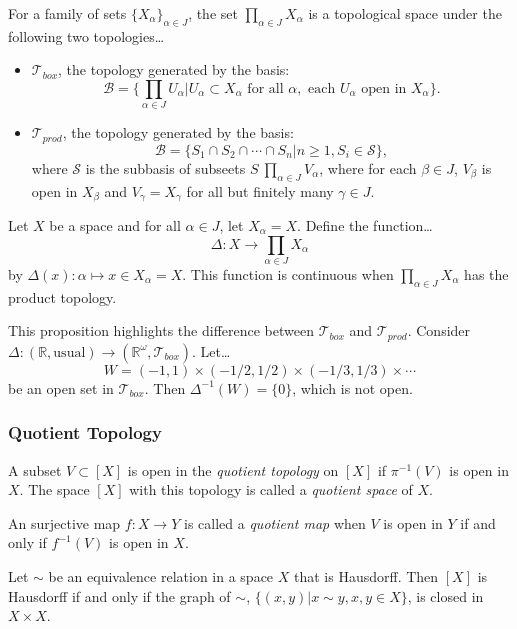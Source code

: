 \label{infiniteproducttopology}
For a family of sets $\{X_{\alpha}\}_{\alpha \in J}$, the set $\prod_{\alpha \in J} X_{\alpha}$ is a topological space under the following two topologies\dots
\begin{itemize}
  \item $\mathcal{T}_{box}$, the topology generated by the basis:
  $$\mathcal{B} = \{ \prod_{\alpha \in J} U_{\alpha} | U_{\alpha} \subset X_{\alpha} \textrm{ for all } \alpha, \textrm{ each } U_{\alpha} \textrm{ open in } X_{\alpha} \}.$$
  \item $\mathcal{T}_{prod}$, the topology generated by the basis:
  $$\mathcal{B} = \{ S_1 \cap S_2 \cap \cdots \cap S_n | n \geq 1, S_i \in \mathcal{S}\},$$
  where $\mathcal{S}$ is the subbasis of subseets $S \ \prod_{\alpha \in J} V_{\alpha}$, where for each $\beta \in J$, $V_{\beta}$ is open in $X_{\beta}$ and $V_{\gamma} = X_{\gamma}$
  for all but finitely many $\gamma \in J$.
\end{itemize}

\begin{proposition}
Let $X$ be a space and for all $\alpha \in J$, let $X_{\alpha} = X$. Define the function\dots
$$\Delta : X \rightarrow \prod_{\alpha \in J} X_{\alpha}$$
by $\Delta(x) : \alpha \mapsto x \in X_{\alpha} = X$. This function is continuous when $\prod_{\alpha \in J} X_{\alpha}$ has the product topology.
\end{proposition}

\noindent This proposition highlights the difference between $\mathcal{T}_{box}$ and $\mathcal{T}_{prod}$. Consider $\Delta : (\mathbb{R}, \textrm{usual}) \rightarrow (\mathbb{R}^{\omega}, \mathcal{T}_{box}).$
Let\dots
$$W = (-1,1) \times (-1/2,1/2) \times (-1/3, 1/3) \times \cdots$$
be an open set in $\mathcal{T}_{box}$. Then $\Delta^{-1}(W) = \{ 0 \}$, which is not open.

\subsubsection{Quotient Topology}\label{quotienttopology}
A subset $V \subset [X]$ is open in the \emph{quotient topology} on $[X]$ if $\pi^{-1}(V)$ is open in $X$. The space $[X]$ with this topology is called a \emph{quotient space} of $X$.

\label{quotientmap}
An surjective map $f : X \rightarrow Y$ is called a \emph{quotient map} when $V$ is open in $Y$ if and only if $f^{-1}(V)$ is open in $X$.

\begin{theorem}
Let $\sim$ be an equivalence relation in a space $X$ that is Hausdorff. Then $[X]$ is Hausdorff if and only if the graph of $\sim$,
$\{ (x,y) | x \sim y, x, y \in X\}$, is closed in $X \times X$.
\end{theorem}